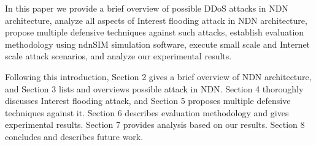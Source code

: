 


In this paper we provide a brief overview of possible DDoS attacks in NDN architecture, analyze all aspects of Interest flooding attack in NDN architecture, propose multiple defensive techniques against such attacks, establish evaluation methodology using ndnSIM simulation software, execute small scale and Internet scale attack scenarios, and analyze our experimental results.

Following this introduction, Section 2 gives a brief overview of NDN architecture, and Section 3 lists and overviews possible attack in NDN. Section 4 thoroughly discusses Interest flooding attack, and Section 5 proposes multiple defensive techniques against it. Section 6 describes evaluation methodology and gives experimental results. Section 7 provides analysis based on our results. Section 8 concludes and describes future work.




